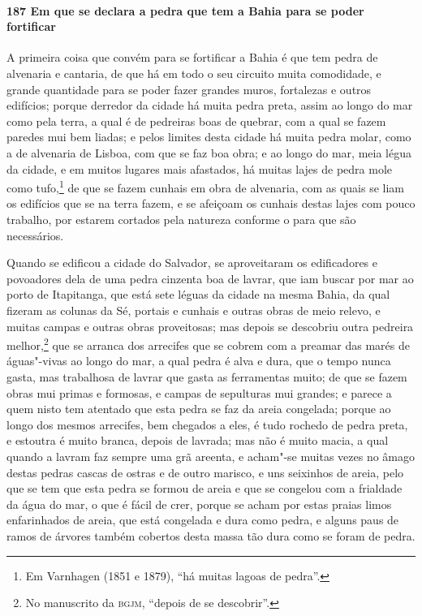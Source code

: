 \begin{linenumbers}
\paragraph{187 Em que se declara a pedra que tem a Bahia para se poder fortificar}\quad
A primeira coisa que convém para se fortificar a Bahia é que tem pedra de alvenaria e
cantaria, de que há em todo o seu circuito muita comodidade, e grande quantidade para se
poder fazer grandes muros, fortalezas e outros edifícios; porque derredor da cidade há
muita pedra preta, assim ao longo do mar como pela terra, a qual é de pedreiras boas de
quebrar, com a qual se fazem paredes mui bem liadas; e pelos limites desta cidade há muita
pedra molar, como a de alvenaria de Lisboa, com que se faz boa obra; e ao longo do mar,
meia légua da cidade, e em muitos lugares mais afastados, há muitas lajes de pedra mole
como tufo,\footnote{ Em Varnhagen (1851 e 1879), ``há muitas lagoas de pedra''.} de que se
fazem cunhais em obra de alvenaria, com as quais se liam os edifícios que se na terra
fazem, e se afeiçoam os cunhais destas lajes com pouco trabalho, por estarem cortados pela
natureza conforme o para que são necessários.

Quando se edificou a cidade do Salvador, se aproveitaram os edificadores e povoadores dela
de uma pedra cinzenta boa de lavrar, que iam buscar por mar ao porto de Itapitanga, que
está sete léguas da cidade na mesma Bahia, da qual fizeram as colunas da Sé, portais e
cunhais e outras obras de meio relevo, e muitas campas e outras obras proveitosas; mas
depois se descobriu outra pedreira melhor,\footnote{ No manuscrito da \textsc{bgjm},
``depois de se descobrir''.} que se arranca dos arrecifes que se cobrem com a preamar das
marés de águas"-vivas ao longo do mar, a qual pedra é alva e dura, que o tempo nunca gasta,
mas trabalhosa de lavrar que gasta as ferramentas muito; de que se fazem obras mui primas
e formosas, e campas de sepulturas mui grandes; e parece a quem nisto tem atentado que
esta pedra se faz da areia congelada; porque ao longo dos mesmos arrecifes, bem chegados a
eles, é tudo rochedo de pedra preta, e estoutra é muito branca, depois de lavrada; mas não
é muito macia, a qual quando a lavram faz sempre uma grã areenta, e acham"-se muitas vezes
no âmago destas pedras cascas de ostras e de outro marisco, e uns seixinhos de areia, pelo
que se tem que esta pedra se formou de areia e que se congelou com a frialdade da água do
mar, o que é fácil de crer, porque se acham por estas praias limos enfarinhados de areia,
que está congelada e dura como pedra, e alguns paus de ramos de árvores também cobertos
desta massa tão dura como se foram de pedra.


\end{linenumbers}
